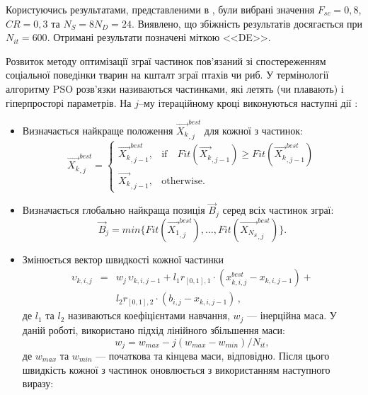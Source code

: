 Користуючись результатами, представленими в \cite{DEWang},
були вибрані значення $F_{sc}=0,8$, $C\!R=0,3$ та $N_S=8N_D=24$.
Виявлено, що збіжність результатів досягається при $N_{it}=600$.
Отримані результати позначені міткою <<DE>>.

Розвиток методу оптимізації зграї частинок пов'язаний зі спостереженням соціальної поведінки тварин на кшталт зграї птахів чи риб.
У термінології алгоритму PSO розв'язки називаються частинками, які летять (чи плавають) і гіперпросторі параметрів.
На $j$--му ітераційному кроці виконуються наступні дії \cite{PSO_Ye}:
\begin{itemize}[leftmargin=0cm,itemindent=1em]
  \item Визначається найкраще положення $\overrightarrow{X_k}_{,j}^{best}$ для кожної з частинок:
 \begin{equation}
 \label{eqPSO_PB}
 \overrightarrow{X_k}_{,j}^{best}=\left\{
 \begin{array}{ll}
 \overrightarrow{X_k}_{,j-1}^{best},& \text{if} \quad Fit(\overrightarrow{X_k}_{,j-1})\geq Fit(\overrightarrow{X_k}_{,j-1}^{best})\\
 \overrightarrow{X_{k}}_{,j-1},& \text{otherwise}.
 \end{array}
 \right.
 \end{equation}
  \item  Визначається глобально найкраща позиція $\overrightarrow{B}_{j}$ серед всіх частинок зграї:
 \begin{equation}
 \label{eqPSO_GB}
 \overrightarrow{B}_{j}=min\{ Fit(\overrightarrow{X_1}_{,j}^{best}),\ldots, Fit(\overrightarrow{X_{N_S}}_{,j}^{best})\}.
 \end{equation}
  \item Змінюється вектор швидкості кожної частинки
\begin{eqnarray}
 \label{eqPSO_Vel}
\upsilon_{k,i,j}&=&w_j\,\upsilon_{k,i,j-1}+l_1r_{[0,1],1}\cdot(x_{k,i,j}^{best}-x_{k,i,j-1})+
\nonumber\\
&&l_2r_{[0,1],2}\cdot(b_{i,j}-x_{k,i,j-1})
\,,
\end{eqnarray}
де
$l_1$ та $l_2$ називаються коефіцієнтами навчання, $w_j$ --- інерційна маса.
У даній роботі, використано підхід лінійного збільшення маси:
 \begin{equation}
 \label{eqPSO_W}
 w_j=w_{max}-j(w_{max}-w_{min})/N_{it},
 \end{equation}
де
$w_{max}$ та $w_{min}$ --- початкова та кінцева маси, відповідно.
Після цього швидкість кожної з частинок оновлюється з використанням наступного виразу:

\end{itemize}
